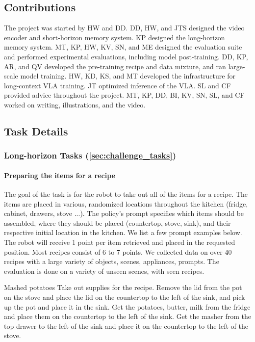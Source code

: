 \newpage
\onecolumn
\appendix

\subsection{Contributions}
The project was started by HW and DD. DD, HW, and JTS designed the video encoder and short-horizon memory system. KP designed the long-horizon memory system. MT, KP, HW, KV, SN, and ME designed the evaluation suite and performed experimental evaluations, including model post-training. DD, KP, AR, and QV developed the pre-training recipe and data mixture, and ran large-scale model training. HW, KD, KS, and MT developed the infrastructure for long-context VLA training. JT optimized inference of the \Acronym{} VLA. SL and CF provided advice throughout the project. MT, KP, DD, BI, KV, SN, SL, and CF worked on writing, illustrations, and the video. 

\subsection{Task Details}
\label{sec:task_details}

\subsubsection{Long-horizon Tasks (\cref{sec:challenge_tasks})}

\paragraph{Preparing the items for a recipe} The goal of the task is for the robot to take out all of the items for a recipe. The items are placed in various, randomized locations throughout the kitchen (fridge, cabinet, drawers, stove ...). The policy's prompt specifies which items should be assembled, where they should be placed (countertop, stove, sink), and their respective initial location in the kitchen. We list a few prompt examples below. The robot will receive 1 point per item retrieved and placed in the requested position. Most recipes consist of 6 to 7 points. We collected data on over 40 recipes with a large variety of objects, scenes, appliances, prompts. The evaluation is done on a variety of unseen scenes, with seen recipes. 
\begin{PromptBox}{Mashed potatoes}
Take out supplies for the recipe. Remove the lid from the pot on the stove and place the lid on the countertop to the left of the sink, and pick up the pot and place it in the sink. Get the potatoes, butter, milk from the fridge and place them on the countertop to the left of the sink. Get the masher from the top drawer to the left of the sink and place it on the countertop to the left of the stove.
\end{PromptBox}

